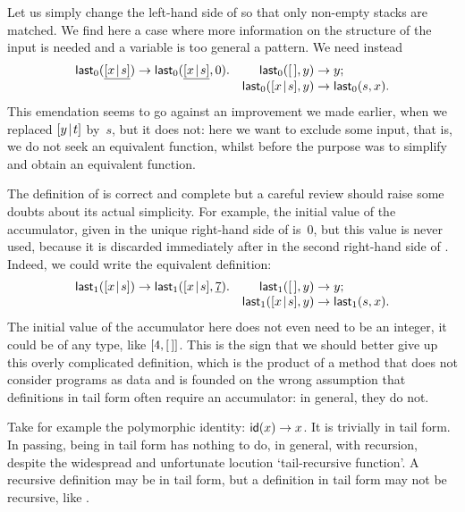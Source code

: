 Let us simply change the left\hyp{}hand side of  so
that only non\hyp{}empty stacks are matched. We find here a case where
more information on the structure of the input is needed and a
variable is too general a pattern. We need instead
\begin{equation*}
\begin{array}{@{}r@{\;}l@{\;}lr@{\;}l@{\;}l@{}}
\fun{last}_0(\underline{\cons{x}{s}}) & \rightarrow &
  \fun{last}_0(\underline{\cons{x}{s}},0). &
\fun{last}_0(\el,y) & \rightarrow & y;\\
&&& \fun{last}_0(\cons{x}{s},y) & \rightarrow & \fun{last}_0(s,x).
\end{array}
\end{equation*}
This emendation seems to go against an improvement we made earlier,
when we replaced \([{y}\!\mid\!{t}]\) by~\(s\), but it does not: here we
want to exclude some input, that is, we do not seek an equivalent
function, whilst before the purpose was to simplify and obtain an
equivalent function.

The definition of  is correct and complete but a
careful review should raise some doubts about its actual
simplicity. For example, the initial value of the accumulator, given
in the unique right\hyp{}hand side of  is~\(0\), but
this value is never used, because it is discarded immediately after in
the second right\hyp{}hand side of . Indeed, we
could write the equivalent definition:
\begin{equation*}
\begin{array}{@{}r@{\;}l@{\;}lr@{\;}l@{\;}l@{}}
\fun{last}_1(\cons{x}{s}) & \rightarrow & \fun{last}_1(\cons{x}{s},\underline{7}). &
\fun{last}_1(\el,y) & \rightarrow & y;\\
&&&\fun{last}_1(\cons{x}{s},y) & \rightarrow & \fun{last}_1(s,x).
\end{array}
\end{equation*}
The initial value of the accumulator here does not even need to be an
integer, it could be of any type, like \([4,[\,]]\). This is the sign
that we should better give up this overly complicated definition,
which is the product of a method that does not consider programs as
data and is founded on the wrong assumption that definitions in tail
form often require an accumulator: in general, they do not.

Take for example the polymorphic identity: \(\textsf{id}(x) \rightarrow
x\). It is trivially in tail form. In passing, being in tail form has
nothing to do, in general, with recursion, despite the widespread and
unfortunate locution `tail\hyp{}recursive function'. A recursive
definition may be in tail form, but a definition in tail form may not
be recursive, like .
